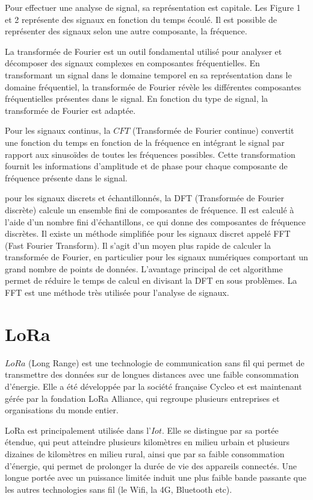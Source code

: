 \documentclass[12pt,a4paper,oneside, titlepage]{report}
\begin{document}
Pour effectuer une analyse de signal, sa représentation est capitale. Les Figure 1 et 2 représente des signaux en fonction du temps écoulé. Il est possible de représenter des signaux selon une autre composante, la fréquence.


La transformée de Fourier est un outil fondamental utilisé pour analyser et décomposer des signaux complexes en composantes fréquentielles. En transformant un signal dans le domaine temporel en sa représentation dans le domaine fréquentiel, la transformée de Fourier révèle les différentes composantes fréquentielles présentes dans le signal. En fonction du type de signal, la transformée de Fourier est adaptée.

Pour les signaux continus, la $CFT$ (Transformée de Fourier continue) convertit une fonction du temps en fonction de la fréquence en intégrant le signal par rapport aux sinusoïdes de toutes les fréquences possibles. Cette transformation fournit les informations d'amplitude et de phase pour chaque composante de fréquence présente dans le signal.

pour les signaux discrets et échantillonnés, la DFT (Transformée de Fourier discrète) calcule un ensemble fini de composantes de fréquence. Il est calculé à l’aide d’un nombre fini d’échantillons, ce qui donne des composantes de fréquence discrètes. Il existe un méthode simplifiée pour les signaux discret appelé FFT (Fast Fourier Transform). Il s'agit d'un moyen plus rapide de calculer la transformée de Fourier, en particulier pour les signaux numériques comportant un grand nombre de points de données. L'avantage principal de cet algorithme permet de réduire le temps de calcul en divisant la DFT en sous problèmes. La FFT est une méthode très utilisée pour l'analyse de signaux.

\newpage

\section{LoRa}

$LoRa$ (Long Range) est une technologie de communication sans fil qui permet de transmettre des données sur de longues distances avec une faible consommation d'énergie. Elle a été développée par la société française Cycleo et est maintenant gérée par la fondation LoRa Alliance, qui regroupe plusieurs entreprises et organisations du monde entier.

LoRa est principalement utilisée dans l'$Iot$. Elle se distingue par sa portée étendue, qui peut atteindre plusieurs kilomètres en milieu urbain et plusieurs dizaines de kilomètres en milieu rural, ainsi que par sa faible consommation d'énergie, qui permet de prolonger la durée de vie des appareils connectés. Une longue portée avec un puissance limitée induit une plus faible bande passante que les autres technologies sans fil (le Wifi, la 4G, Bluetooth etc).
\end{document}
